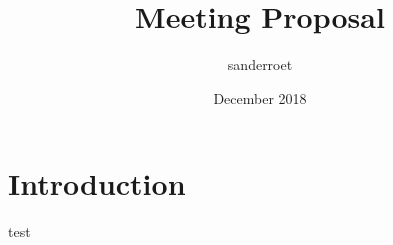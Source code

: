 \documentclass{article}
\title{Meeting Proposal}
\author{sanderroet }
\date{December 2018}
\begin{document}
\maketitle

\section{Introduction}
test~\cite{test}



\end{document}
